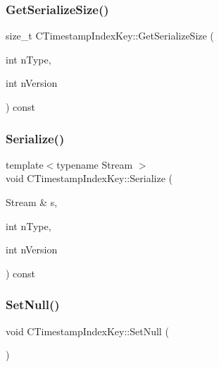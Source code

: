 \subsubsection{\texorpdfstring{Get\+Serialize\+Size()}{GetSerializeSize()}}
{\footnotesize\ttfamily size\+\_\+t C\+Timestamp\+Index\+Key\+::\+Get\+Serialize\+Size (\begin{DoxyParamCaption}\item[{int}]{n\+Type,  }\item[{int}]{n\+Version }\end{DoxyParamCaption}) const\hspace{0.3cm}{\ttfamily [inline]}}

\mbox{\label{struct_c_timestamp_index_key_af08cb17ed40232b5708b862f86aaffec}} 
\subsubsection{\texorpdfstring{Serialize()}{Serialize()}}
{\footnotesize\ttfamily template$<$typename Stream $>$ \\
void C\+Timestamp\+Index\+Key\+::\+Serialize (\begin{DoxyParamCaption}\item[{Stream \&}]{s,  }\item[{int}]{n\+Type,  }\item[{int}]{n\+Version }\end{DoxyParamCaption}) const\hspace{0.3cm}{\ttfamily [inline]}}

\mbox{\label{struct_c_timestamp_index_key_a022b090d576c984bcdf6934608c58ba6}} 
\subsubsection{\texorpdfstring{Set\+Null()}{SetNull()}}
{\footnotesize\ttfamily void C\+Timestamp\+Index\+Key\+::\+Set\+Null (\begin{DoxyParamCaption}{ }\end{DoxyParamCaption})\hspace{0.3cm}{\ttfamily [inline]}}


